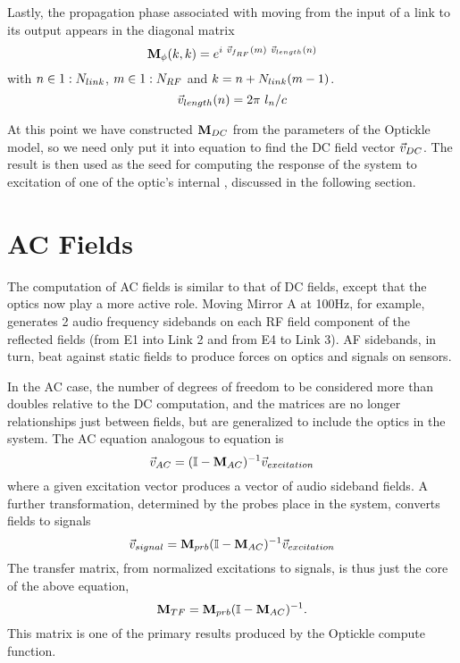 \documentclass[12pt]{article}
\begin{document}
Lastly, the propagation phase associated with moving from the input of a link to its output appears in the diagonal matrix
\begin{equation}
\mPhi(k,k) = e^{i ~ \vFrf(m) ~ \vLen(n)}
\elabel{mPhi}
\end{equation}
with $n \in 1:N_{link}$, $m \in 1:N_{RF}$ and $k = n + N_{link} (m - 1)$.
\begin{equation}
\vec{v}_{length}(n) = 2 \pi ~ l_n / c
\end{equation}

At this point we have constructed $\mathbf{M}_{DC}$ from the parameters of the Optickle model, so we need only put it into equation  to find the DC field vector $\vec{v}_{DC}$.
The result is then used as the seed for computing the response of the system to excitation of one of the optic's internal \dsf, discussed in the following section.

\section{AC Fields}

The computation of AC fields is similar to that of DC fields, except that the optics now play a more active role.
Moving Mirror A at 100Hz, for example, generates 2 audio frequency sidebands on each RF field component of the reflected fields (from E1 into Link 2 and from E4 to Link 3).
AF sidebands, in turn, beat against static fields to produce forces on optics and signals on sensors.

In the AC case, the number of degrees of freedom to be considered more than doubles relative to the DC computation, and the matrices are no longer relationships just between fields, but are generalized to include the optics in the system.
The AC equation analogous to equation  is
\begin{equation}
\vAC = (\matI - \mAC)^{-1} \vExc
\elabel{vAC}
\end{equation}
where a given excitation vector produces a vector of audio sideband fields.
A further transformation, determined by the probes place in the system, converts fields to signals
\begin{equation}
\vSig = \mPrb (\matI - \mAC)^{-1} \vExc
\elabel{vSig}
\end{equation}
The transfer matrix, from normalized excitations to signals, is thus just the core of the above equation,
\begin{equation}
\mTF = \mPrb (\matI - \mAC)^{-1}
\elabel{mTF}.
\end{equation}
This matrix is one of the primary results produced by the Optickle compute function.
\end{document}
